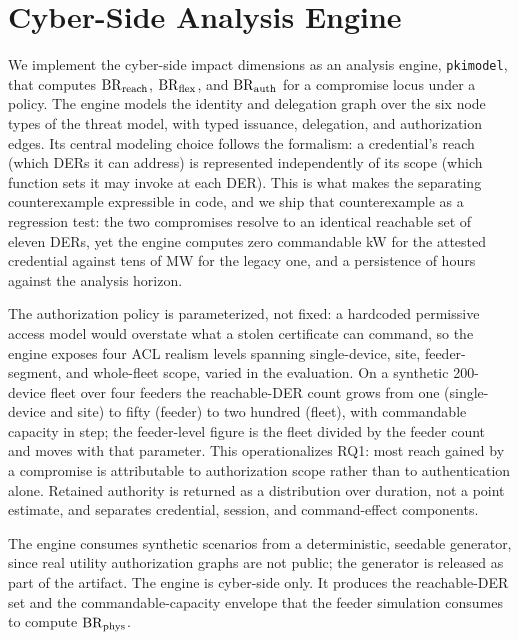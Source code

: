 \section{Cyber-Side Analysis Engine}

We implement the cyber-side impact dimensions as an analysis engine, \texttt{pkimodel}, that computes
$\mathrm{BR}_{\mathrm{reach}}$, $\mathrm{BR}_{\mathrm{flex}}$, and $\mathrm{BR}_{\mathrm{auth}}$ for a compromise locus under a policy. The engine models
the identity and delegation graph over the six node types of the threat model, with typed
issuance, delegation, and authorization edges. Its central modeling choice follows the
formalism: a credential's reach (which DERs it can address) is represented independently of
its scope (which function sets it may invoke at each DER). This is what makes the separating
counterexample expressible in code, and we ship that counterexample as a regression test:
the two compromises resolve to an identical reachable set of eleven DERs, yet the engine
computes zero commandable kW for the attested credential against tens of MW for the legacy
one, and a persistence of hours against the analysis horizon.

The authorization policy is parameterized, not fixed: a hardcoded permissive access model would
overstate what a stolen certificate can command, so the engine exposes four ACL realism levels
spanning single-device, site, feeder-segment, and whole-fleet scope, varied in the evaluation. On a
synthetic 200-device fleet over four feeders the reachable-DER count grows from one (single-device
and site) to fifty (feeder) to two hundred (fleet), with commandable capacity in step; the
feeder-level figure is the fleet divided by the feeder count and moves with that parameter. This
operationalizes RQ1: most reach gained by a compromise is attributable to authorization scope
rather than to authentication alone. Retained authority is returned as a distribution over
duration, not a point estimate, and separates credential, session, and command-effect components.

The engine consumes synthetic scenarios from a deterministic, seedable generator, since real
utility authorization graphs are not public; the generator is released as part of the
artifact. The engine is cyber-side only. It produces the reachable-DER set and the
commandable-capacity envelope that the feeder simulation consumes to compute $\mathrm{BR}_{\mathrm{phys}}$.

